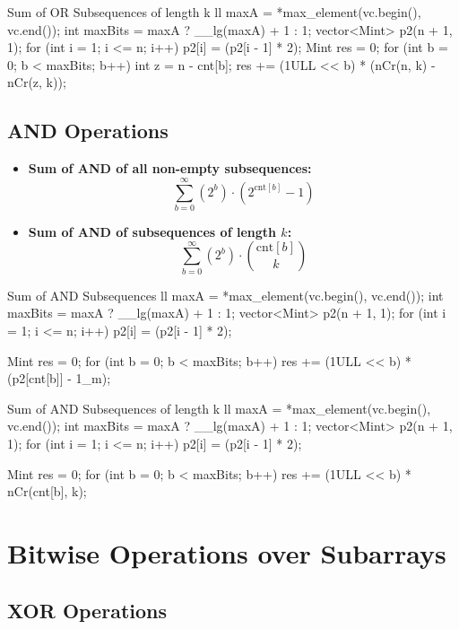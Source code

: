 \documentclass[10pt]{article}
\newcommand{\complexity}[1]{%
  \tcbox[on line,
    colback=tagbg,
    colframe=tagbg,
    boxrule=0pt,
    arc=2pt,
    boxsep=0pt,
    left=3.5pt, right=3.5pt, top=1.5pt, bottom=1.5pt
  ]{\color{tagtext}\scriptsize\bfseries\ensuremath{#1}}%
}
\begin{document}
\begin{vscode}{Sum of OR Subsequences of length k \complexity{O(N \log(\max A))}}
ll maxA = *max_element(vc.begin(), vc.end());
int maxBits = maxA ? __lg(maxA) + 1 : 1;
vector<Mint> p2(n + 1, 1);
for (int i = 1; i <= n; i++) 
    p2[i] = (p2[i - 1] * 2);
Mint res = 0;
for (int b = 0; b < maxBits; b++) 
{
    int z = n - cnt[b];
    res += (1ULL << b) * (nCr(n, k) - nCr(z, k));
}
\end{vscode}

\newpage
\subsection{AND Operations}
\begin{itemize}
    \item \textbf{Sum of AND of all non-empty subsequences:}
          \[ \sum_{b = 0}^{\infty} (2^b) \cdot (2^{\text{cnt}[b]} - 1) \]
    \item \textbf{Sum of AND of subsequences of length $k$:}
          \[ \sum_{b = 0}^{\infty} (2^b) \cdot \binom{\text{cnt}[b]}{k} \]
\end{itemize}

\begin{vscode}{Sum of AND Subsequences \complexity{O(N \log(\max A))}}
ll maxA = *max_element(vc.begin(), vc.end());
int maxBits = maxA ? __lg(maxA) + 1 : 1;
vector<Mint> p2(n + 1, 1);
for (int i = 1; i <= n; i++) 
    p2[i] = (p2[i - 1] * 2);

Mint res = 0;
for (int b = 0; b < maxBits; b++) 
    res += (1ULL << b) * (p2[cnt[b]] - 1_m);
\end{vscode}

\begin{vscode}{Sum of AND Subsequences of length k \complexity{O(N \log(\max A))}}
ll maxA = *max_element(vc.begin(), vc.end());
int maxBits = maxA ? __lg(maxA) + 1 : 1;
vector<Mint> p2(n + 1, 1);
for (int i = 1; i <= n; i++) 
    p2[i] = (p2[i - 1] * 2);

Mint res = 0;
for (int b = 0; b < maxBits; b++) 
    res += (1ULL << b) * nCr(cnt[b], k);
\end{vscode}

\newpage
\section{Bitwise Operations over Subarrays}

\subsection{XOR Operations}
\end{document}

